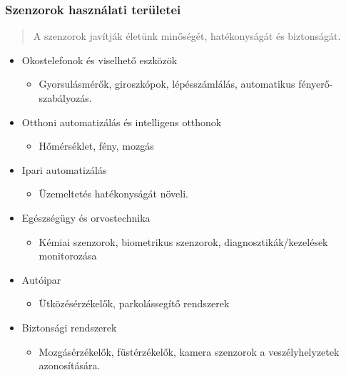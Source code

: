 \subsubsection{Szenzorok használati területei}
\begin{quote}
    A szenzorok javítják életünk minőségét, hatékonyságát és biztonságát.
\end{quote}
\begin{itemize}
    \item Okostelefonok és viselhető eszközök
    \begin{itemize}
        \item Gyorsulásmérők, giroszkópok, lépésszámlálás, automatikus fényerő-szabályozás.
    \end{itemize}
    \item Otthoni automatizálás és intelligens otthonok
    \begin{itemize}
        \item Hőmérséklet, fény, mozgás
    \end{itemize}
    \item Ipari automatizálás
    \begin{itemize}
        \item Üzemeltetés hatékonyságát növeli.
    \end{itemize}
    \item Egészségügy és orvostechnika
    \begin{itemize}
        \item Kémiai szenzorok, biometrikus szenzorok, diagnosztikák/kezelések monitorozása
    \end{itemize}
    \item Autóipar
    \begin{itemize}
        \item Ütközésérzékelők, parkolássegítő rendszerek
    \end{itemize}
    \item Biztonsági rendszerek
    \begin{itemize}
        \item Mozgásérzékelők, füstérzékelők, kamera szenzorok a veszélyhelyzetek azonosítására.
    \end{itemize}
\end{itemize}

\clearpage
